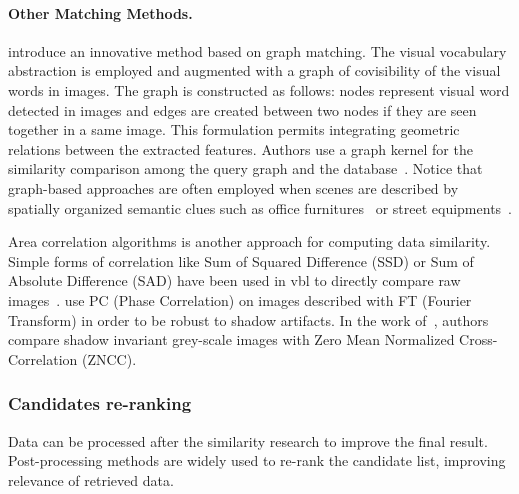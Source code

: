 \paragraph{Other Matching Methods.}
\citet{Stumm2015a} introduce an innovative method based on graph matching. The visual vocabulary abstraction is employed and augmented with a graph of covisibility of the visual words in images. The graph is constructed as follows: nodes represent visual word detected in images and edges are created between two nodes if they are seen together in a same image. This formulation permits integrating geometric relations between the extracted features. Authors use a graph kernel for the similarity comparison among the query graph and the database~\citep{Stumm2015,Stumm2016}. Notice that graph-based approaches are often employed when scenes are described by spatially organized semantic clues such as office furnitures~\citep{Salas-Moreno2013} or street equipments~\citep{Ardeshir2014}.

Area correlation algorithms is another approach for computing data similarity. Simple forms of correlation like Sum of Squared Difference (SSD) or Sum of Absolute Difference (SAD) have been used in \ac{vbl} to directly compare raw images~\citep{Poglitsch2015,Milford2015}. \citet{Wan2016} use PC (Phase Correlation) on images described with FT (Fourier Transform) in order to be robust to shadow artifacts. In the work of~\citep{Corke2013}, authors compare shadow invariant grey-scale images with Zero Mean Normalized Cross-Correlation (ZNCC).


\subsubsection{Candidates re-ranking}
\label{subsec:candidates_re_ranking}
Data can be processed after the similarity research to improve the final result. Post-processing methods are widely used to re-rank the candidate list, improving relevance of retrieved data.

